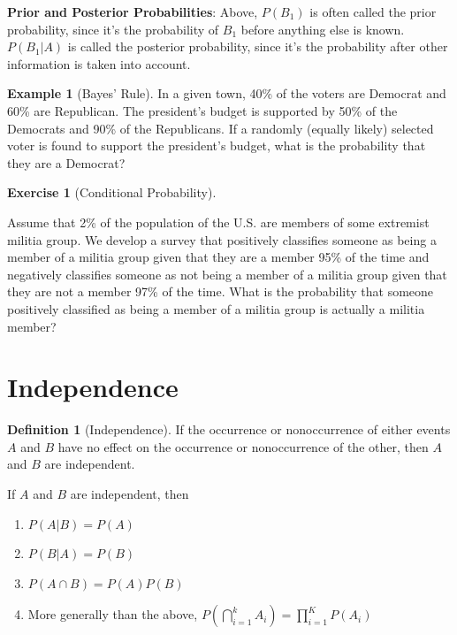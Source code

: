 \documentclass[
]{book}
\providecommand{\tightlist}{%
  \setlength{\itemsep}{0pt}\setlength{\parskip}{0pt}}
\theoremstyle{definition}
\newtheorem{definition}{Definition}[chapter]
\theoremstyle{definition}
\newtheorem{example}{Example}[chapter]
\theoremstyle{definition}
\newtheorem{exercise}{Exercise}[chapter]
\theoremstyle{remark}
\begin{document}
\textbf{Prior and Posterior Probabilities}: Above, \(P(B_1)\) is often called the prior probability, since it's the probability of \(B_1\) before anything else is known. \(P(B_1|A)\) is called the posterior probability, since it's the probability after other information is taken into account.

\begin{example}[Bayes' Rule]
\protect\hypertarget{exm:bayesrule}{}{\label{exm:bayesrule} {} }
In a given town, 40\% of the voters are Democrat and 60\% are Republican. The president's budget is supported by 50\% of the Democrats and 90\% of the Republicans. If a randomly (equally likely) selected voter is found to support the president's budget, what is the probability that they are a Democrat?
\end{example}

\begin{exercise}[Conditional Probability]
\protect\hypertarget{exr:condprobexr}{}{\label{exr:condprobexr} {} }

Assume that 2\% of the population of the U.S. are members of some extremist militia group. We develop a survey that positively classifies someone as being a member of a militia group given that they are a member 95\% of the time and negatively classifies someone as not being a member of a militia group given that they are not a member 97\% of the time. What is the probability that someone positively classified as being a member of a militia group is actually a militia member?
\end{exercise}

\hypertarget{independence}{%
\section{Independence}\label{independence}}

\begin{definition}[Independence]
\protect\hypertarget{def:unnamed-chunk-70}{}{\label{def:unnamed-chunk-70} {} } If the occurrence or nonoccurrence of either events \(A\) and \(B\) have no effect on the occurrence or nonoccurrence of the other, then \(A\) and \(B\) are independent.
\end{definition}

If \(A\) and \(B\) are independent, then

\begin{enumerate}
\def\labelenumi{\arabic{enumi}.}
\tightlist
\item
  \(P(A|B)=P(A)\)
\item
  \(P(B|A)=P(B)\)
\item
  \(P(A\cap B)=P(A)P(B)\)
\item
  More generally than the above, \(P(\bigcap_{i=1}^k A_i) = \prod_{i = 1}^K P(A_i)\)
\end{enumerate}
\end{document}
